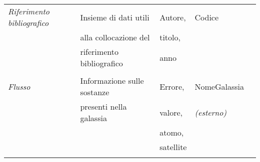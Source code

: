 \documentclass[12pt,a4paper,onecolumn,x11names]{article}
\begin{document}
\begin{table}[h!]
\begin{tabular}{lllll}
%
			\textit{Riferimento bibliografico}	& Insieme di dati utili & Autore,		&	Codice				\\
				& alla collocazione del & titolo,		&					\\
			& riferimento bibliografico & anno		&					\\
			&						&				&					\\
			\textit{Flusso}			& Informazione sulle sostanze & Errore, 		& NomeGalassia \\
			& presenti nella galassia	&	valore,		& \textit{(esterno)}\\
			&							& atomo,		&					\\
			&							& satellite	&						\\
			&							&			&						\\
			
		\end{tabular}
	\end{table}
\end{document}
